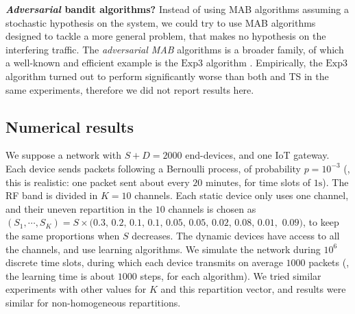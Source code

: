 \textbf{\emph{Adversarial} bandit algorithms?}
%
Instead of using MAB algorithms assuming a stochastic hypothesis on the system, we could try to use MAB algorithms designed to tackle a more general problem, that makes no hypothesis on the interfering traffic.
The \emph{adversarial MAB} algorithms is a broader family, of which a well-known and efficient example is the $\mathrm{Exp}3$ algorithm \cite{Auer02,Bubeck12}.
Empirically, the $\mathrm{Exp}3$ algorithm turned out to perform significantly worse than both \UCB{} and TS in the same experiments,
therefore we did not report results here.



\subsection{Numerical results}\label{sub:41:numericalResults}

We suppose a network with $S + D = 2000$ end-devices, and one IoT gateway.
Each device sends packets following a Bernoulli process, of probability $p = 10^{-3}$ (\eg, this is realistic: one packet sent about every $20$ minutes, for time slots of $1\mathrm{s}$).
The RF band is divided in $K = 10$ channels.
Each static device only uses one channel, and their uneven repartition in the $10$ channels is chosen as $(S_1,\cdots, S_{K}) = S \times (0.3, \, 0.2, \, 0.1, \, 0.1, \, 0.05, \, 0.05, \, 0.02, \, 0.08, \, 0.01,$ $0.09)$, to keep the same proportions when $S$ decreases. The dynamic devices have access to all the channels, and use learning algorithms.
%
We simulate the network during $10^6$ discrete time slots, during which each device transmits on average $1000$ packets (\ie, the learning time is about $1000$ steps, for each algorithm).
We tried similar experiments with other values for $K$ and this repartition vector, and results were similar for non-homogeneous repartitions.

